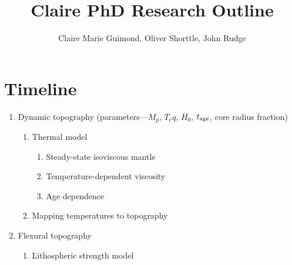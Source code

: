 \documentclass[10pt,a4paper]{article}
\author{Claire Marie Guimond, Oliver Shorttle, John Rudge}
\title{Claire PhD Research Outline}
\begin{document}
\maketitle
\section{Timeline}
\begin{enumerate}
\item Dynamic topography (parameters---$M_p$, $T_eq$, $H_0$, $t_{\rm age}$, core radius fraction) 
	\begin{enumerate}
	\item Thermal model
		\begin{enumerate}
		\item Steady-state isoviscous mantle
		\item Temperature-dependent viscosity
		\item Age dependence
		\end{enumerate}
	\item Mapping temperatures to topography
	\end{enumerate}
		
\item Flexural topography
	\begin{enumerate}
	\item Lithospheric strength model
	\end{enumerate}
	
\end{enumerate}
	
		
\end{document}
